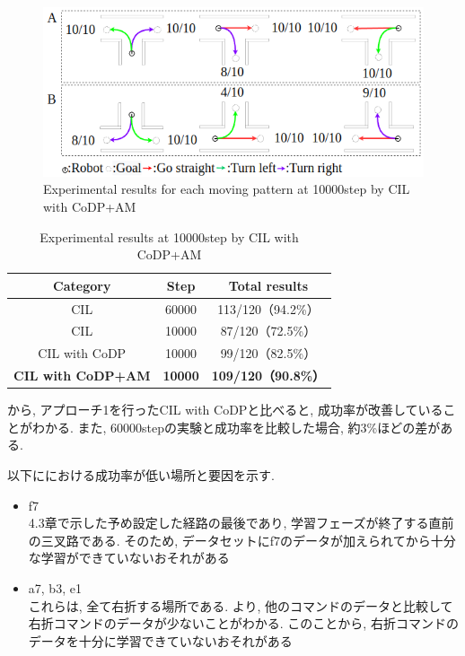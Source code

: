   
  \begin{figure}[hbtp]
    \centering
   \includegraphics[keepaspectratio, scale=0.55]
        {images/10000step_act1.5.png}
   \caption{Experimental results for each moving pattern at 10000step by CIL with CoDP+AM}
   \label{Fig:10000step_act1.5}
  \end{figure}  
  

  \begin{table}[hbtp]
    \caption{Experimental results at 10000step by CIL with CoDP+AM}
    \label{table:result4}
    \centering
    \begin{tabular}{|c|c|c|}
      \hline
      Category & Step & Total results\\
      \hline
      CIL & 60000 & 113/120（94.2\%）\\
      \hline
      CIL & 10000 & 87/120（72.5\%）\\
      \hline
      CIL with CoDP & 10000 & 99/120（82.5\%）\\
      \hline
        \textbf{CIL with CoDP+AM}
       & \textbf{10000} & \textbf{109/120（90.8\%）}\\
      \hline
    \end{tabular}
  \end{table}


  から, アプローチ1を行ったCIL with CoDPと比べると, 成功率が改善していることがわかる. また, 60000stepの実験と成功率を比較した場合, 約3\%ほどの差がある. 

  
  以下ににおける成功率が低い場所と要因を示す.
  \begin{itemize}
    \item f7\\
    4.3章で示した予め設定した経路の最後であり, 学習フェーズが終了する直前の三叉路である. そのため, データセットにf7のデータが加えられてから十分な学習ができていないおそれがある
    \item a7, b3, e1\\
    これらは, 全て右折する場所である. より, 他のコマンドのデータと比較して右折コマンドのデータが少ないことがわかる. このことから, 右折コマンドのデータを十分に学習できていないおそれがある
  \end{itemize} 


